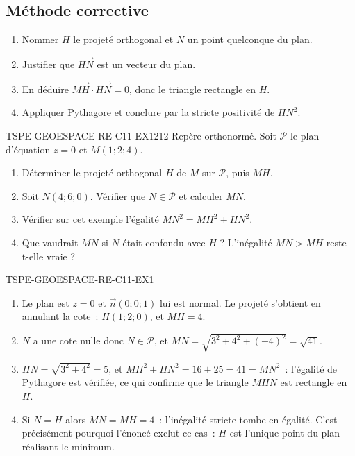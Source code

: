 \subsection*{Méthode corrective}

\begin{enumerate}
  \item Nommer $H$ le projeté orthogonal et $N$ un point quelconque du plan.
  \item Justifier que $\vec{HN}$ est un vecteur du plan.
  \item En déduire $\vec{MH}\cdot\vec{HN}=0$, donc le triangle rectangle en $H$.
  \item Appliquer Pythagore et conclure par la stricte positivité de $HN^2$.
\end{enumerate}


\begin{exercice}{TSPE-GEOESPACE-RE-C11-EX1}{2}{12}
Repère orthonormé. Soit $\mathcal{P}$ le plan d'équation $z=0$ et $M(1;2;4)$.
\begin{enumerate}
  \item Déterminer le projeté orthogonal $H$ de $M$ sur $\mathcal{P}$, puis
        $MH$.
  \item Soit $N(4;6;0)$. Vérifier que $N\in\mathcal{P}$ et calculer $MN$.
  \item Vérifier sur cet exemple l'égalité $MN^{2}=MH^{2}+HN^{2}$.
  \item Que vaudrait $MN$ si $N$ était confondu avec $H$ ? L'inégalité
        $MN>MH$ reste-t-elle vraie ?
\end{enumerate}
\end{exercice}


\begin{corrige}{TSPE-GEOESPACE-RE-C11-EX1}
\begin{enumerate}
  \item Le plan est $z=0$ et $\vec{n}(0;0;1)$ lui est normal. Le projeté
        s'obtient en annulant la cote~: $H(1;2;0)$, et $MH=4$.
  \item $N$ a une cote nulle donc $N\in\mathcal{P}$, et
        $MN=\sqrt{3^{2}+4^{2}+(-4)^{2}}=\sqrt{41}$.
  \item $HN=\sqrt{3^{2}+4^{2}}=5$, et $MH^{2}+HN^{2}=16+25=41=MN^{2}$~:
        l'égalité de Pythagore est vérifiée, ce qui confirme que le triangle
        $MHN$ est rectangle en $H$.
  \item Si $N=H$ alors $MN=MH=4$~: l'inégalité stricte tombe en égalité. C'est
        précisément pourquoi l'énoncé exclut ce cas~: $H$ est l'unique point
        du plan réalisant le minimum.
\end{enumerate}
\end{corrige}
